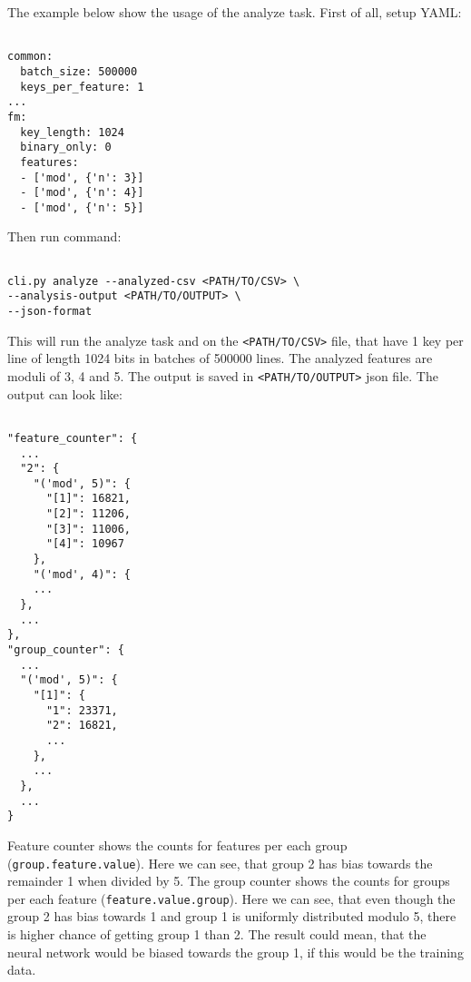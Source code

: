 \noindent
The example below show the usage of the analyze task. First of all, setup YAML:

\begin{verbatim}

common:
  batch_size: 500000
  keys_per_feature: 1
...  
fm:
  key_length: 1024
  binary_only: 0
  features:
  - ['mod', {'n': 3}]
  - ['mod', {'n': 4}]
  - ['mod', {'n': 5}]

\end{verbatim}

\noindent
Then run command:

\begin{verbatim}

cli.py analyze --analyzed-csv <PATH/TO/CSV> \
--analysis-output <PATH/TO/OUTPUT> \
--json-format

\end{verbatim}

\noindent
This will run the analyze task and on the \texttt{<PATH/TO/CSV>} file, that have 1 key per line of length 1024 bits in batches of 500000 lines. The analyzed features are moduli of 3, 4 and 5. The output is saved in \texttt{<PATH/TO/OUTPUT>} json file. The output can look like:

\begin{verbatim}

"feature_counter": {
  ...
  "2": {
    "('mod', 5)": {
      "[1]": 16821,
      "[2]": 11206,
      "[3]": 11006,
      "[4]": 10967      
    },
    "('mod', 4)": {
    ...  
  },
  ...
},
"group_counter": {
  ...
  "('mod', 5)": {
    "[1]": {
      "1": 23371,
      "2": 16821,
      ...
    },
    ...
  },
  ...
}  

\end{verbatim}

\noindent
Feature counter shows the counts for features per each group (\texttt{group.feature.value}). Here we can see, that group 2 has bias towards the remainder 1 when divided by 5. The group counter shows the counts for groups per each feature (\texttt{feature.value.group}). Here we can see, that even though the group 2 has bias towards 1 and group 1 is uniformly distributed modulo 5, there is higher chance of getting group 1 than 2. The result could mean, that the neural network would be biased towards the group 1, if this would be the training data.



